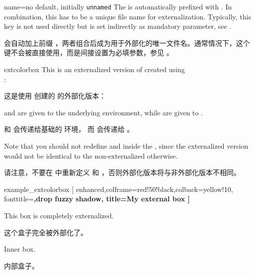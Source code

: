\begin{extTcbKey}[][doc new=2015-03-11]{name}{=}{no default,
  initially \texttt{unnamed}}
The  is automatically prefixed with .
In combination, this has to be a unique file name for externalization.
Typically, this key is not used directly but is set indirectly as
mandatory parameter, see .

 会自动加上前缀 ，两者组合后成为用于外部化的唯一文件名。通常情况下，这个键不会被直接使用，而是间接设置为必填参数，参见 。
\end{extTcbKey}

\begin{docEnvironment}[doc new=2015-03-11]{extcolorbox}{}
This is an externalized version of  created
using\\ :

这是使用  创建的  的外部化版本：
\begin{dispListing}
\end{dispListing}
 and  are given to the underlying 
environment, while  are given to .

 和  会传递给基础的  环境，
而  会传递给 。

\begin{marker}
Note that you should not redefine  and 
inside the , since the
externalized version would not be identical to the non-externalized
otherwise.

请注意，不要在  中重新定义  和 ，否则外部化版本将与非外部化版本不相同。
\end{marker}

\begin{dispExample}
\begin{extcolorbox}[minipage]{example_extcolorbox}
[ enhanced,colframe=red!50!black,colback=yellow!10,
fonttitle=\bfseries,drop fuzzy shadow,
title=My external box ]

This box is completely externalized.

这个盒子完全被外部化了。

\begin{tcolorbox}[colframe=blue,colback=blue!5,before skip=6pt]
Inner box.

内部盒子。
\end{tcolorbox}
\end{extcolorbox}
\end{dispExample}
\end{docEnvironment}

